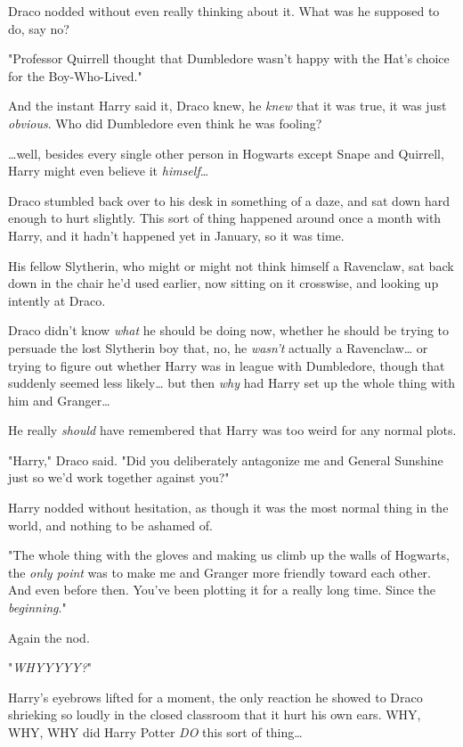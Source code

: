 Draco nodded without even really thinking about it. What was he supposed to do, 
say no?

"Professor Quirrell thought that Dumbledore wasn't happy with the Hat's choice 
for the Boy-Who-Lived."

And the instant Harry said it, Draco knew, he \emph{knew} that it was true, it 
was just \emph{obvious}. Who did Dumbledore even think he was fooling?

{\ldots}well, besides every single other person in Hogwarts except Snape and 
Quirrell, Harry might even believe it \emph{himself}{\ldots}

Draco stumbled back over to his desk in something of a daze, and sat down hard 
enough to hurt slightly. This sort of thing happened around once a month with 
Harry, and it hadn't happened yet in January, so it was time.

His fellow Slytherin, who might or might not think himself a Ravenclaw, sat 
back down in the chair he'd used earlier, now sitting on it crosswise, and 
looking up intently at Draco.

Draco didn't know \emph{what} he should be doing now, whether he should be 
trying to persuade the lost Slytherin boy that, no, he \emph{wasn't} actually a 
Ravenclaw{\ldots} or trying to figure out whether Harry was in league with 
Dumbledore, though that suddenly seemed less likely{\ldots} but then \emph{why} 
had Harry set up the whole thing with him and Granger{\ldots}

He really \emph{should} have remembered that Harry was too weird for any normal 
plots.

"Harry," Draco said. "Did you deliberately antagonize me and General Sunshine 
just so we'd work together against you?"

Harry nodded without hesitation, as though it was the most normal thing in the 
world, and nothing to be ashamed of.

"The whole thing with the gloves and making us climb up the walls of Hogwarts, 
the \emph{only point} was to make me and Granger more friendly toward each 
other. And even before then. You've been plotting it for a really long time. 
Since the \emph{beginning}."

Again the nod.

"\emph{WHYYYYY?}"

Harry's eyebrows lifted for a moment, the only reaction he showed to Draco 
shrieking so loudly in the closed classroom that it hurt his own ears. WHY, 
WHY, WHY did Harry Potter \emph{DO} this sort of thing{\ldots}

